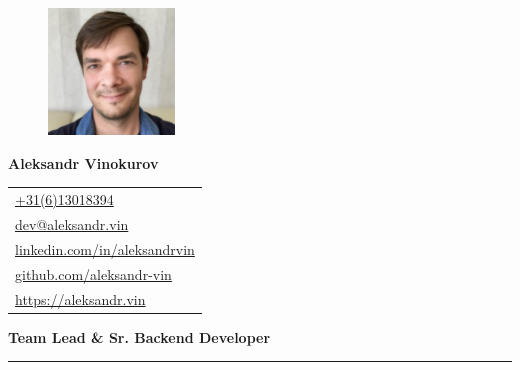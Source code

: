 \documentclass[letterpaper, 11pt]{article}
\begin{document}
\begin{figure} %
  \vspace{-5ex} %
  \includegraphics[width=0.3\textwidth]{me.jpg} %
\end{figure}

\noindent\textbf{\Huge Aleksandr Vinokurov}

\vspace{1em}

\noindent
\begin{tabular}{@{\hspace{5mm}}l}
\href{tel:+31613018394}{\url{+31(6)13018394}} \\
\href{mailto:dev@aleksandr.vin}{\url{dev@aleksandr.vin}} \\
\href{https://linkedin.com/in/aleksandrvin}{\url{linkedin.com/in/aleksandrvin}} \\
\href{https://github.com/aleksandr-vin}{\url{github.com/aleksandr-vin}} \\
\href{https://aleksandr.vin}{\url{https://aleksandr.vin}}
\end{tabular}

\vspace{1em}

\noindent\parbox{\linewidth}{\raggedright\textbf{\Large Team Lead \& Sr. Backend Developer}} %

\vspace{1em}













\vspace{5em}
\hrule
\vspace{1em}
\end{document}
